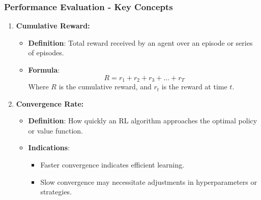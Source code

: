 \documentclass{beamer}
\begin{document}
\begin{frame}[fragile]
    \frametitle{Performance Evaluation - Key Concepts}
    \begin{enumerate}
        \item \textbf{Cumulative Reward:}
        \begin{itemize}
            \item \textbf{Definition}: Total reward received by an agent over an episode or series of episodes.
            \item \textbf{Formula}: 
            \begin{equation}
                R = r_1 + r_2 + r_3 + \ldots + r_T
            \end{equation}
            Where \( R \) is the cumulative reward, and \( r_t \) is the reward at time \( t \).
        \end{itemize}

        \item \textbf{Convergence Rate:}
        \begin{itemize}
            \item \textbf{Definition}: How quickly an RL algorithm approaches the optimal policy or value function.
            \item \textbf{Indications}: 
            \begin{itemize}
                \item Faster convergence indicates efficient learning.
                \item Slow convergence may necessitate adjustments in hyperparameters or strategies.
            \end{itemize}
        \end{itemize}
    \end{enumerate}
\end{frame}
\end{document}
